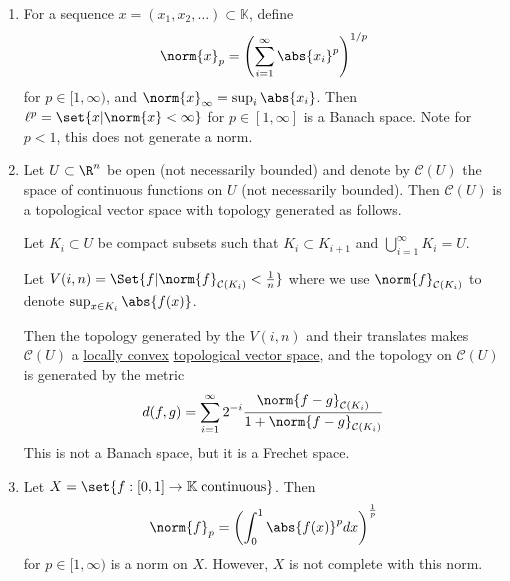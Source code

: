 \documentclass{article}
\newcommand{\K}{\mathbb{K}}
\begin{document}
\begin{eg}
\begin{enumerate}[label=(\roman*)]
\begin{equation*}
                \norm{f}_{C^k(\bar{U})} = \max_{\abs{\alpha} \leq k} \norm {D^\alpha f}_\infty
            \end{equation*}
            Then $C^\K(\bar{U})$ is a Banach space.
        \item For a sequence $x = (x_1, x_2, \dotsc) \subset \K$, define
            \begin{equation*}
                \norm{x}_p = \left(\sum_{i=1}^\infty \abs{x_i}^p\right)^{1/p}
            \end{equation*}
            for $p \in [1, \infty)$, and $\norm{x}_\infty = \sup_i \abs{x_i}$.  Then $\ell^p = \set{x | \norm{x} < \infty}$ for $p \in [1, \infty]$ is a Banach space.  Note for $p<1$, this does not generate a norm.
        \item Let $U \subset \R^n$ be open (not necessarily bounded) and denote by $\mathcal{C}(U)$ the space of continuous functions on $U$ (not necessarily bounded). Then $\mathcal{C}(U)$ is a topological vector space with topology generated as follows.

            Let $K_i \subset U$ be compact subsets such that $K_i \subset K_{i+1}$ and $\bigcup_{i=1}^\infty K_i = U$.

            Let $V(i, n) = \Set{f | \norm{f}_{\mathcal{C}(K_i)} < \frac1n}$ where we use $\norm{f}_{\mathcal{C}(K_i)}$ to denote $\sup_{x \in K_i} \abs{f(x)}$.

            Then the topology generated by the $V(i, n)$ and their translates makes $\mathcal{C}(U)$ a \hyperlink{def:locallyConvex}{locally convex} \hyperlink{def:topologicalVectorSpace}{topological vector space}, and the topology on $\mathcal{C}(U)$ is generated by the metric
            \begin{equation*}
                d(f, g) = \sum_{i=1}^\infty 2^{-i} \frac{\norm{f-g}_{\mathcal{C}(K_i)}}{1 + \norm{f-g}_{\mathcal{C}(K_i)}}
            \end{equation*}
            This is not a Banach space, but it is a Frechet space.

        \item Let $X = \set{f : [0, 1] \to \K \; \text{continuous}}$. Then
            \begin{equation*}
                \norm{f}_p = \left(\int_0^1 \abs{f(x)}^p dx\right)^\frac1p
            \end{equation*}
            for $p \in [1, \infty)$ is a norm on $X$. However, $X$ is not complete with this norm.
    \end{enumerate}
\end{eg}
\end{document}
